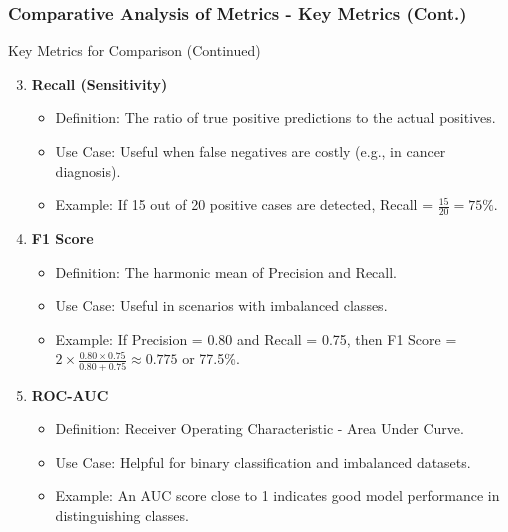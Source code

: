\documentclass[aspectratio=169]{beamer}
\begin{document}
\begin{frame}[fragile]
    \frametitle{Comparative Analysis of Metrics - Key Metrics (Cont.)}
    \begin{block}{Key Metrics for Comparison (Continued)}
        \begin{enumerate}
            \setcounter{enumi}{2}
            \item \textbf{Recall (Sensitivity)}
            \begin{itemize}
                \item Definition: The ratio of true positive predictions to the actual positives.
                \item Use Case: Useful when false negatives are costly (e.g., in cancer diagnosis).
                \item Example: If 15 out of 20 positive cases are detected, Recall = $\frac{15}{20} = 75\%$.
            \end{itemize}

            \item \textbf{F1 Score}
            \begin{itemize}
                \item Definition: The harmonic mean of Precision and Recall.
                \item Use Case: Useful in scenarios with imbalanced classes.
                \item Example: If Precision = 0.80 and Recall = 0.75, then F1 Score = $2 \times \frac{0.80 \times 0.75}{0.80 + 0.75} \approx 0.775$ or 77.5\%.
            \end{itemize}

            \item \textbf{ROC-AUC}
            \begin{itemize}
                \item Definition: Receiver Operating Characteristic - Area Under Curve.
                \item Use Case: Helpful for binary classification and imbalanced datasets.
                \item Example: An AUC score close to 1 indicates good model performance in distinguishing classes.
            \end{itemize}
        \end{enumerate}
    \end{block}
\end{frame}
\end{document}
